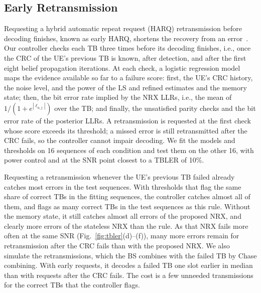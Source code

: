 \subsection{Early Retransmission}
Requesting a hybrid automatic repeat request (HARQ) retransmission before decoding finishes, known as early HARQ, shortens the recovery from an error~\cite{goektepe2018subcode,strodthoff2019early}. Our controller checks each TB three times before its decoding finishes, i.e., once the CRC of the UE's previous TB is known, after detection, and after the first eight belief propagation iterations. At each check, a logistic regression model maps the evidence available so far to a failure score: first, the UE's CRC history, the noise level, and the power of the LS and refined estimates and the memory state; then, the bit error rate implied by the NRX LLRs, i.e., the mean of $1/(1+e^{|\ell_{u,j}|})$ over the TB; and finally, the unsatisfied parity checks and the bit error rate of the posterior LLRs. A retransmission is requested at the first check whose score exceeds its threshold; a missed error is still retransmitted after the CRC fails, so the controller cannot impair decoding. We fit the models and thresholds on 16 sequences of each condition and test them on the other 16, with power control and at the SNR point closest to a TBLER of 10\%.

Requesting a retransmission whenever the UE's previous TB failed already catches most errors in the test sequences. With thresholds that flag the same share of correct TBs in the fitting sequences, the controller catches almost all of them, and flags as many correct TBs in the test sequences as this rule. Without the memory state, it still catches almost all errors of the proposed NRX, and clearly more errors of the stateless NRX than the rule. As that NRX fails more often at the same SNR (Fig.~\ref{fig:tbler}(d)--(f)), many more errors remain for retransmission after the CRC fails than with the proposed NRX. We also simulate the retransmissions, which the BS combines with the failed TB by Chase combining. With early requests, it decodes a failed TB one slot earlier in median than with requests after the CRC fails. The cost is a few unneeded transmissions for the correct TBs that the controller flags.
